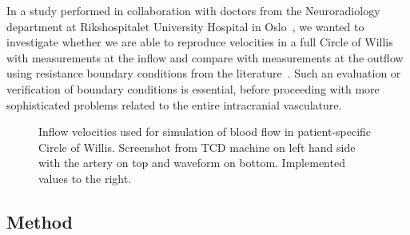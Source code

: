 In a study performed in collaboration with doctors from the
Neuroradiology department at Rikshospitalet University Hospital in
Oslo~\cite{rh}, we wanted to investigate whether we are able to
reproduce velocities in a full Circle of Willis with measurements at
the inflow and compare with measurements at the outflow using
resistance boundary conditions from the literature~\cite{AlastrueyParkerPeiroEtAl2007,
  VignonClementel}. Such an evaluation or verification of boundary
conditions is essential, before proceeding with more sophisticated
problems related to the entire intracranial vasculature.

\begin{figure}
  \begin{center}
  \end{center}
  \caption{Inflow velocities used for simulation of blood flow in
    patient-specific Circle of Willis. Screenshot from TCD machine on
    left hand side with the artery on top and waveform on
    bottom. Implemented values to the right.}
  \label{fig:cok_inflow}
\end{figure}

\subsection{Method}

